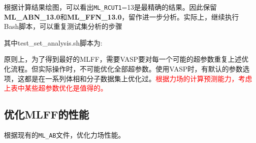 根据计算结果绘图，可以看出\texttt{ML\_RCUT1}=13是最精确的结果。因此保留\textbf{ML\_ABN\_13.0}和\textbf{ML\_FFN\_13.0}，留作进一步分析。实际上，继续执行\textrm{Bash}脚本，可以重复测试集分析的步骤

其中\textrm{test\_set\_analysis.sh}脚本为:

原则上，为了得到最好的\textrm{MLFF}，需要\textrm{VASP}要对每一个可能的超参数重复上述优化流程。但实际操作时，不可能优化全部超参数。使用\textrm{VASP}时，有默认的参数选项，这都是在一系列体相和分子数据集上优化过。\textcolor{red}{根据力场的计算预测能力，考虑上表中某些超参数优化是值得的。}

\subsection{优化\rm{MLFF}的性能}
根据现有的\texttt{ML\_AB}文件，优化力场性能。

